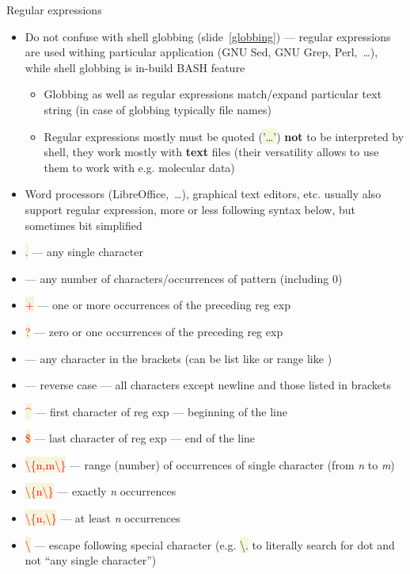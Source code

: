 \documentclass[compress, xelatex, 11pt, xcolor=svgnames, aspectratio=169, url={hyphens, lowtilde}]{beamer}
\renewcommand{\texttt}[1]{\colorbox{Beige}{{\ttfamily #1}}}
\renewcommand{\alert}[1]{\textcolor{red}{#1}}
\begin{document}
\begin{frame}[allowframebreaks]{Regular expressions}
\begin{itemize}
		\item Do not confuse with shell globbing (slide~\ref{globbing}) --- regular expressions are used withing particular application (GNU Sed, GNU Grep, Perl,~\ldots), while shell globbing is in-build BASH feature
		\begin{itemize}
			\item Globbing as well as regular expressions match/expand particular text string (in case of globbing typically file names)
			\item Regular expressions mostly must be quoted (\texttt{'\ldots'}) \textbf{not} to be interpreted by shell, they work mostly with \textbf{text} files (their versatility allows to use them to work with e.g. molecular data)
		\end{itemize}
		\item Word processors (LibreOffice,~\ldots), graphical text editors, etc. usually also support regular expression, more or less following syntax below, but sometimes bit simplified
		\item \alert{\texttt{.}} --- any single character
		\item \alert{\texttt{*}} --- any number of characters/occurrences of pattern (including 0)
		\item \alert{\texttt{+}} --- one or more occurrences of the preceding reg exp
		\item \alert{\texttt{?}} --- zero or one occurrences of the preceding reg exp
		\item \alert{\texttt{[\ldots]}} --- any character in the brackets (can be list like \texttt{[abcd]} or range like \texttt{[a-kxz4-8\_-]})
		\item \alert{\texttt{[\textasciicircum\ldots]}} --- reverse case --- all characters except newline and those listed in brackets
		\item \alert{\texttt{\textasciicircum}} --- first character of reg exp --- beginning of the line
		\item \alert{\texttt{\$}} --- last character of reg exp --- end of the line
		\item \alert{\texttt{\textbackslash\{n,m\textbackslash\}}} --- range (number) of occurrences of single character (from \textit{n} to \textit{m})
		\item \alert{\texttt{\textbackslash\{n\textbackslash\}}} --- exactly \textit{n} occurrences
		\item \alert{\texttt{\textbackslash\{n,\textbackslash\}}} --- at least \textit{n} occurrences
		\item \alert{\texttt{\textbackslash}} --- escape following special character (e.g. \texttt{\textbackslash .} to literally search for dot and not \enquote{any single character})

\end{itemize}
\end{frame}
\end{document}
